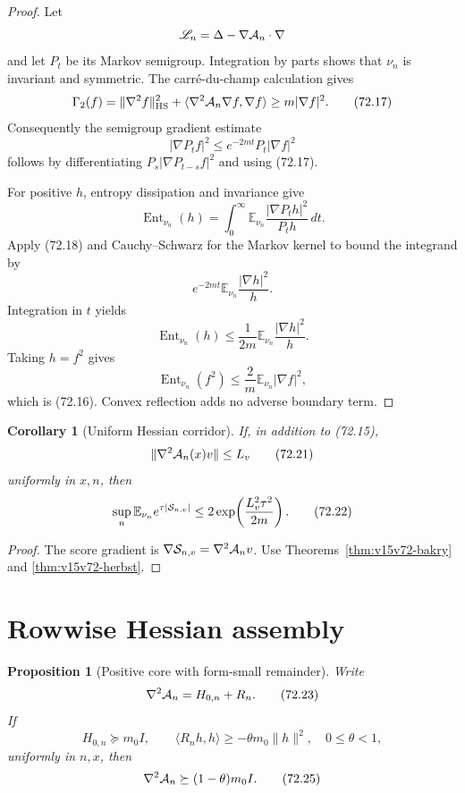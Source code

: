 \documentclass[11pt]{article}
\newtheorem{proposition}[theorem]{Proposition}
\newtheorem{corollary}[theorem]{Corollary}
\theoremstyle{remark}
\begin{document}
\begin{proof}
Let
\[
 {\mathscr L}_n=\Delta-\nabla{\cal A}_n\mathbin{\cdot}\nabla
\]
and let \(P_t\) be its Markov semigroup.  Integration by parts shows
that \(\nu_n\) is invariant and symmetric.  The carré-du-champ
calculation gives
\[
 \Gamma_2(f)
 =
 \|\nabla^2f\|_{\rm HS}^2+
 \langle\nabla^2{\cal A}_n\nabla f,\nabla f\rangle
 \geq m|\nabla f|^2.                                  \tag{72.17}
\]
Consequently the semigroup gradient estimate
\[
 |\nabla P_tf|^2\leq e^{-2mt}P_t|\nabla f|^2           \tag{72.18}
\]
follows by differentiating
\(P_s|\nabla P_{t-s}f|^2\) and using (72.17).

For positive \(h\), entropy dissipation and invariance give
\[
 \operatorname{Ent}_{\nu_n}(h)
 =
 \int_0^\infty
 \mathbb E_{\nu_n}
 \frac{|\nabla P_th|^2}{P_th}\,dt.                    \tag{72.19}
\]
Apply (72.18) and Cauchy--Schwarz for the Markov kernel to bound the
integrand by
\[
 e^{-2mt}
 \mathbb E_{\nu_n}\frac{|\nabla h|^2}{h}.
\]
Integration in \(t\) yields
\[
 \operatorname{Ent}_{\nu_n}(h)
 \leq
 \frac1{2m}
 \mathbb E_{\nu_n}\frac{|\nabla h|^2}{h}.             \tag{72.20}
\]
Taking \(h=f^2\) gives
\[
 \operatorname{Ent}_{\nu_n}(f^2)
 \leq\frac2m\mathbb E_{\nu_n}|\nabla f|^2,
\]
which is (72.16).  Convex reflection adds no adverse boundary term.
\end{proof}

\begin{corollary}[Uniform Hessian corridor]
\label{cor:v15v72-corridor}
If, in addition to (72.15),
\[
 \|\nabla^2{\cal A}_n(x)v\|\leq L_v                   \tag{72.21}
\]
uniformly in \(x,n\), then
\[
 \sup_n\mathbb E_{\nu_n}e^{\tau|{\cal S}_{n,v}|}
 \leq
 2\exp\!\left(\frac{L_v^2\tau^2}{2m}\right).           \tag{72.22}
\]
\end{corollary}

\begin{proof}
The score gradient is
\(\nabla{\cal S}_{n,v}=\nabla^2{\cal A}_n v\).
Use Theorems~\ref{thm:v15v72-bakry} and
\ref{thm:v15v72-herbst}.
\end{proof}

\section{Rowwise Hessian assembly}

\begin{proposition}[Positive core with form-small remainder]
\label{prop:v15v72-form-small}
Write
\[
 \nabla^2{\cal A}_n=H_{0,n}+R_n.                      \tag{72.23}
\]
If
\[
 H_{0,n}\succeq m_0I,\qquad
 \langle R_nh,h\rangle\geq-\theta m_0\|h\|^2,
 \quad0\leq\theta<1,                                  \tag{72.24}
\]
uniformly in \(n,x\), then
\[
 \nabla^2{\cal A}_n\succeq(1-\theta)m_0I.             \tag{72.25}
\]
\end{proposition}
\end{document}
